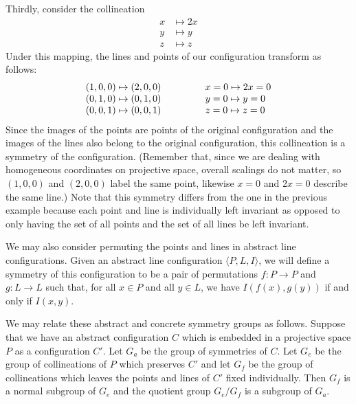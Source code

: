 \documentclass[12pt]{article}
\begin{document}
Thirdly, consider the collineation
\begin{align*}
 x &\mapsto 2x \\
 y &\mapsto y \\
 z &\mapsto z
\end{align*}
Under this mapping, the lines and points of our configuration 
transform as follows:
\[ \begin{matrix}
 (1,0,0) \mapsto (2,0,0) \hskip 0.5in \hfill & x = 0 \mapsto 2x = 0 \hfill \\
 (0,1,0) \mapsto (0,1,0) \hfill & y = 0 \mapsto y = 0 \hfill \\
 (0,0,1) \mapsto (0,0,1) \hfill & z = 0 \mapsto z = 0 \hfill
\end{matrix} \]
Since the images of the points are points of the original configuration and
the images of the lines also belong to the original configuration, this
collineation is a symmetry of the configuration.  (Remember that, since we
are dealing with homogeneous coordinates on projective space, overall scalings
do not matter, so $(1,0,0)$ and $(2,0,0)$ label the same point, likewise 
$x = 0$ and $2x = 0$ describe the same line.)  Note that this symmetry 
differs from the one in the previous example because each point and line is
individually left invariant as opposed to only having the set of all points
and the set of all lines be left invariant.

We may also consider permuting the points and lines in abstract line
configurations.  Given an abstract line configuration $\langle P, L, I
\rangle$, we will define a symmetry of this configuration to be a pair
of permutations $f \colon P \to P$ and $g \colon L \to L$ such that, for
all $x \in P$ and all $y \in L$, we have $I(f(x), g(y))$ if and only if
$I(x, y)$. 

We may relate these abstract and concrete symmetry groups as follows.  
Suppose that we have an abstract configuration $C$ which is embedded 
in a  projective space $P$ as a configuration $C'$.  Let $G_a$ be the
group of symmetries of $C$.  Let $G_e$ be the group of collineations
of $P$ which preserves $C'$ and let $G_f$ be the group of collineations  
which leaves the points and lines of $C'$ fixed individually.  Then
$G_f$ is a normal subgroup of $G_e$ and the quotient group $G_e/G_f$ 
is a subgroup of $G_a$.
\end{document}

